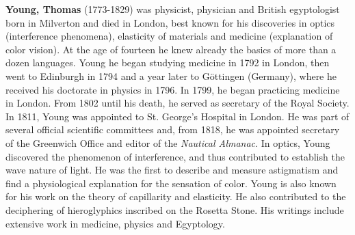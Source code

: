 \textbf{Young, Thomas} (1773-1829) was physicist, physician and British egyptologist born in Milverton and died in London, best known for his discoveries in optics (interference phenomena), elasticity of materials and medicine (explanation of color vision). At the age of fourteen he knew already the basics of more than a dozen languages. Young he began studying medicine in 1792 in London, then went to Edinburgh in 1794 and a year later to Göttingen (Germany), where he received his doctorate in physics in 1796. In 1799, he began practicing medicine in London. From 1802 until his death, he served as secretary of the Royal Society. In 1811, Young was appointed to St. George's Hospital in London. He was part of several official scientific committees and, from 1818, he was appointed secretary of the Greenwich Office and editor of the \textit{Nautical Almanac}. In optics, Young discovered the phenomenon of interference, and thus contributed to establish the wave nature of light. He was the first to describe and measure astigmatism and find a physiological explanation for the sensation of color. Young is also known for his work on the theory of capillarity and elasticity. He also contributed to the deciphering of hieroglyphics inscribed on the Rosetta Stone. His writings include extensive work in medicine, physics and Egyptology.

{}

